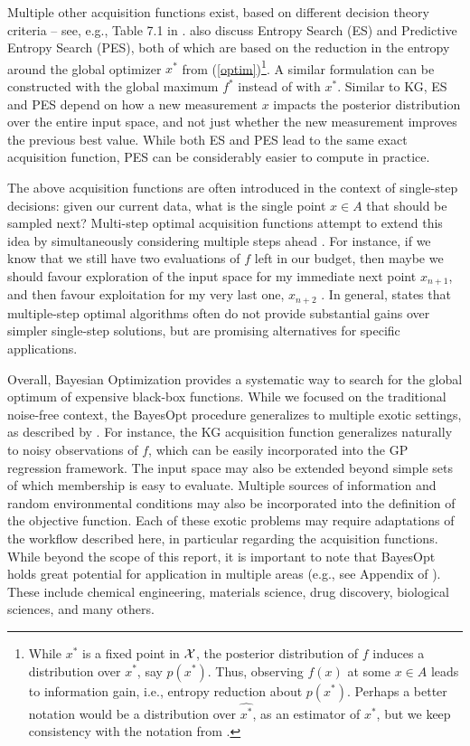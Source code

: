 Multiple other acquisition functions exist, based on different decision theory criteria -- see, e.g., Table 7.1 in .  also discuss Entropy Search (ES) and Predictive Entropy Search (PES), both of which are based on the reduction in the entropy around the global optimizer $x^*$ from (\ref{optim})\footnote{While $x^*$ is a fixed point in $\mathcal{X}$, the posterior distribution of $f$ induces a distribution over $x^*$, say $p(x^*)$. Thus, observing $f(x)$ at some $x\in A$ leads to information gain, i.e., entropy reduction about $p(x^*)$. Perhaps a better notation would be a distribution over $\widehat{x^*}$, as an estimator of $x^*$, but we keep consistency with the notation from .}. A similar formulation can be constructed with the global maximum $f^*$ instead of with $x^*$. Similar to KG, ES and PES depend on how a new measurement $x$ impacts the posterior distribution over the entire input space, and not just whether the new measurement improves the previous best value. While both ES and PES lead to the same exact acquisition function, PES can be considerably easier to compute in practice.

The above acquisition functions are often introduced in the context of single-step decisions: given our current data, what is the single point $x\in A$ that should be sampled next? Multi-step optimal acquisition functions attempt to extend this idea by simultaneously considering multiple steps ahead \cite{Frazier2018}. For instance, if we know that we still have two evaluations of $f$ left in our budget, then maybe we should favour exploration of the input space for my immediate next point $x_{n+1}$, and then favour exploitation for my very last one, $x_{n+2}$ \cite{Garnett2023}. In general,  states that multiple-step optimal algorithms often do not provide substantial gains over simpler single-step solutions, but are promising alternatives for specific applications.

Overall, Bayesian Optimization provides a systematic way to search for the global optimum of expensive black-box functions. While we focused on the traditional noise-free context, the BayesOpt procedure generalizes to multiple exotic settings, as described by . For instance, the KG acquisition function generalizes naturally to noisy observations of $f$, which can be easily incorporated into the GP regression framework. The input space may also be extended beyond simple sets of which membership is easy to evaluate. Multiple sources of information and random environmental conditions may also be incorporated into the definition of the objective function. Each of these exotic problems may require adaptations of the workflow described here, in particular regarding the acquisition functions. While beyond the scope of this report, it is important to note that BayesOpt holds great potential for application in multiple areas (e.g., see Appendix of ). These include chemical engineering, materials science, drug discovery, biological sciences, and many others.